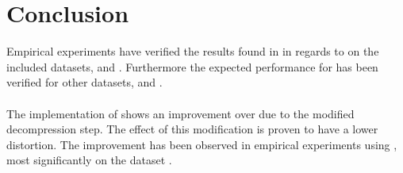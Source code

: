 \section{Conclusion}
\label{conclusion}
Empirical experiments have verified the results found in \cite{wagner17} in regards to \qs{} on the included datasets, \mnist{} and \sift{}. Furthermore the expected performance for \qs{} has been verified for other datasets, \gist{} and \clust{}.
\\
\\
The implementation of \qsr{} shows an improvement over \qs{} due to the modified decompression step. The effect of this modification is proven to have a lower distortion. The improvement has been observed in empirical experiments using \qsr{}, most significantly on the dataset \mnist{}.
